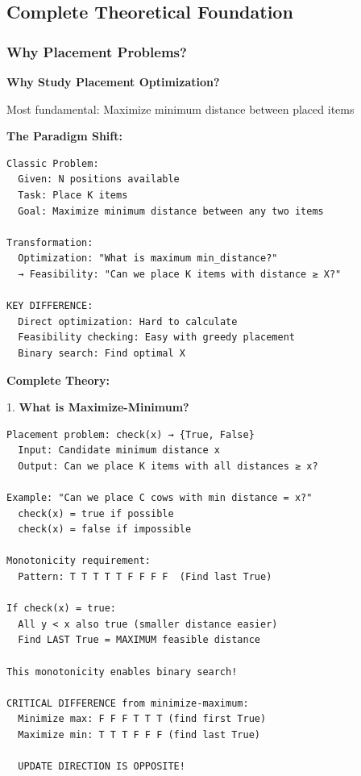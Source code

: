 \documentclass[11pt,a4paper,oneside]{book}
\begin{document}
\subsection{Complete Theoretical Foundation}

\subsubsection{Why Placement Problems?}

\begin{tcolorbox}[
    enhanced,breakable,
    colback=white,
    colframe=deepblue,
    boxrule=1.5pt,
    arc=3mm,
    title=\textbf{The Maximize-Minimum Paradigm}
]
\textbf{Why Study Placement Optimization?}

Most fundamental: Maximize minimum distance between placed items

\textbf{The Paradigm Shift:}
\begin{verbatim}
Classic Problem:
  Given: N positions available
  Task: Place K items
  Goal: Maximize minimum distance between any two items
  
Transformation:
  Optimization: "What is maximum min_distance?"
  → Feasibility: "Can we place K items with distance ≥ X?"
  
KEY DIFFERENCE:
  Direct optimization: Hard to calculate
  Feasibility checking: Easy with greedy placement
  Binary search: Find optimal X
\end{verbatim}

\textbf{Complete Theory:}

1. \textbf{What is Maximize-Minimum?}
\begin{verbatim}
Placement problem: check(x) → {True, False}
  Input: Candidate minimum distance x
  Output: Can we place K items with all distances ≥ x?

Example: "Can we place C cows with min distance = x?"
  check(x) = true if possible
  check(x) = false if impossible

Monotonicity requirement:
  Pattern: T T T T T F F F F  (Find last True)

If check(x) = true:
  All y < x also true (smaller distance easier)
  Find LAST True = MAXIMUM feasible distance

This monotonicity enables binary search!

CRITICAL DIFFERENCE from minimize-maximum:
  Minimize max: F F F T T T (find first True)
  Maximize min: T T T F F F (find last True)
  
  UPDATE DIRECTION IS OPPOSITE!
\end{verbatim}


\end{tcolorbox}
\end{document}
